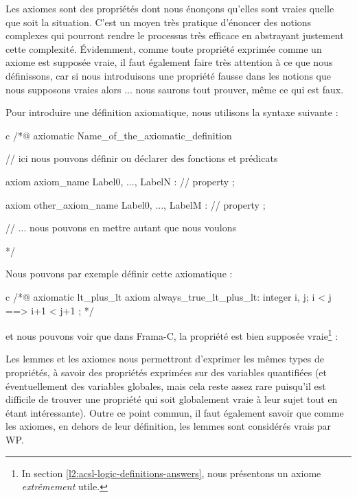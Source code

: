 
Les axiomes sont des propriétés dont nous énonçons qu'elles sont vraies quelle
que soit la situation. C'est un moyen très pratique d'énoncer des notions
complexes qui pourront rendre le processus très efficace en abstrayant
justement cette complexité. Évidemment, comme toute propriété exprimée comme un
axiome est supposée vraie, il faut également faire très attention à ce que nous
définissons, car si nous introduisons une propriété fausse dans les notions que
nous supposons vraies alors ... nous saurons tout prouver, même ce qui est faux.





Pour introduire une définition axiomatique, nous utilisons la syntaxe suivante :



\begin{CodeBlock}{c}
/*@
  axiomatic Name_of_the_axiomatic_definition {
    // ici nous pouvons définir ou déclarer des fonctions et prédicats

    axiom axiom_name { Label0, ..., LabelN }:
      // property ;

    axiom other_axiom_name { Label0, ..., LabelM }:
      // property ;

    // ... nous pouvons en mettre autant que nous voulons
  }
*/
\end{CodeBlock}



Nous pouvons par exemple définir cette axiomatique :



\begin{CodeBlock}{c}
/*@
  axiomatic lt_plus_lt{
    axiom always_true_lt_plus_lt:
      \forall integer i, j; i < j ==> i+1 < j+1 ;
  }
*/
\end{CodeBlock}



et nous pouvons voir que dans Frama-C, la propriété est bien supposée
vraie\footnote{In section \ref{l2:acsl-logic-definitions-answers}, nous
présentons un axiome \emph{extrêmement} utile.} :






Les lemmes et les axiomes nous permettront d'exprimer les mêmes types de
propriétés, à savoir des propriétés exprimées sur des variables quantifiées (et
éventuellement des variables globales, mais cela reste assez rare puisqu'il est
difficile de trouver une propriété qui soit globalement vraie à leur sujet tout
en étant intéressante). Outre ce point commun, il faut également savoir que
comme les axiomes, en dehors de leur définition, les lemmes sont considérés
vrais par WP.




